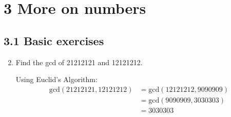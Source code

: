 \documentclass[10pt,\jkfside,a4paper]{article}
\begin{document}
\section*{3 More on numbers}

\subsection*{3.1 Basic exercises}

\begin{enumerate}

\setcounter{enumi}{1}
\item Find the gcd of 21212121 and 12121212.

Using Euclid's Algorithm:
\begin{equation}
\begin{split}
\text{gcd}(21212121, 12121212) &= \text{gcd}(12121212, 9090909)\\
							   &= \text{gcd}(9090909, 3030303)\\
							   &= 3030303\\
\end{split}
\end{equation}


\end{enumerate}
\end{document}
